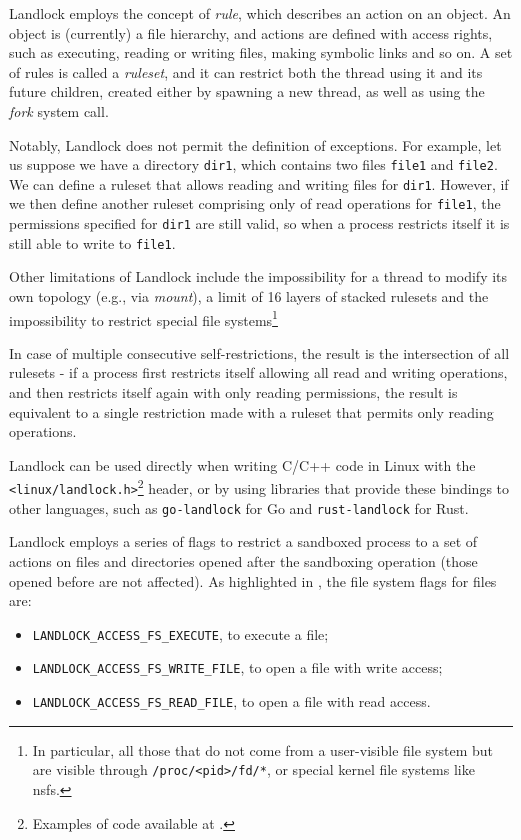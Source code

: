 Landlock employs the concept of \textit{rule}, which describes an action
on an object. An object is (currently) a file hierarchy, and actions are
defined with access rights, such as executing, reading or writing files, making
symbolic links and so on.
A set of rules is called a \textit{ruleset}, and it can restrict both the thread
using it and its future children, created either by spawning a new thread, as well
as using the \textit{fork} system call.

Notably, Landlock does not permit the definition of exceptions.
For example, let us suppose we have a directory \texttt{dir1}, which contains two files
\texttt{file1} and \texttt{file2}. We can define a ruleset that allows
reading and writing files for \texttt{dir1}.
However, if we then define another ruleset comprising only of read operations
for \texttt{file1}, the permissions specified for \texttt{dir1} are still
valid, so when a process restricts itself it is still able to write to \texttt{file1}.

Other limitations of Landlock include the impossibility for a thread to modify its own topology
(e.g., via \textit{mount}), a limit of 16 layers of stacked rulesets and the impossibility to
restrict special file systems\footnote{In particular, all those that do not come from a user-visible file system
but are visible through \texttt{/proc/<pid>/fd/*}, or special kernel file systems like nsfs.}

In case of multiple consecutive self-restrictions, the result is the intersection
of all rulesets - if a process first restricts itself allowing all read and writing operations,
and then restricts itself again with only reading permissions, the result is equivalent
to a single restriction made with a ruleset that permits only reading operations.

Landlock can be used directly when writing C/C++ code in Linux with the
\texttt{<linux/landlock.h>}\footnote{Examples of code available at \cite{landlock-user-space}.}
header, or by using libraries that provide these bindings to other languages,
such as \texttt{go-landlock} \cite{go-landlock}
for Go and \texttt{rust-landlock} \cite{rust-landlock} for Rust.

Landlock employs a series of flags to restrict a sandboxed process to a set of actions on files and
directories opened after the sandboxing operation (those opened before are not affected).
As highlighted in \cite{landlock-user-space}, the file system flags for files are:
\begin{itemize}
  \item \texttt{LANDLOCK\_ACCESS\_FS\_EXECUTE}, to execute a file;
  \item \texttt{LANDLOCK\_ACCESS\_FS\_WRITE\_FILE}, to open a file with write access;
  \item \texttt{LANDLOCK\_ACCESS\_FS\_READ\_FILE}, to open a file with read access.
\end{itemize}

